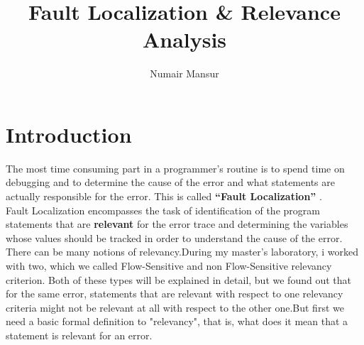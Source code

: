 \documentclass{article}
\title{Fault Localization \& Relevance Analysis }
\author{Numair Mansur}
\begin{document}
\maketitle
\section{Introduction}
The most time consuming part in a programmer’s routine is to spend time on debugging and to determine the cause of the error and what statements are actually responsible for the error. This is called \textbf{“Fault Localization”} . 
\\
Fault Localization encompasses the task of identification of the program statements that are \textbf{relevant}  for the error trace and determining the variables whose values should be tracked in order to understand the cause of the error. 
\\
There can be many notions of relevancy.During my master’s laboratory, i worked with two, which we called Flow-Sensitive and non Flow-Sensitive relevancy criterion. Both of these types will be explained in detail, but we found out that for the same error, statements that are relevant with respect to one relevancy criteria might not be relevant at all with respect to the other one.But first we need a basic formal definition to "relevancy", that is, what does it mean that a statement is relevant for an error.
\end{document}
